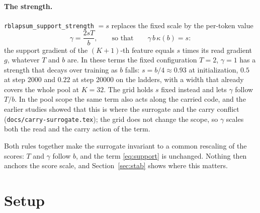 \documentclass[11pt,a4paper]{article}
\newcommand{\code}[1]{\texttt{#1}}
\begin{document}
\paragraph{The strength.}
\code{rblapsum\_support\_strength} $= s$ replaces the fixed scale by the
per-token value
\begin{equation}
\gamma = \frac{2 s T}{b},
\qquad\text{so that}\qquad
\gamma\,b\,\kappa(b) = s :
\label{eq:strength}
\end{equation}
the support gradient of the $(K{+}1)$-th feature equals $s$ times its read
gradient $g$, whatever $T$ and $b$ are. In these terms the fixed configuration
$T = 2$, $\gamma = 1$ has a strength that decays over training as $b$ falls:
$s = b/4 \approx 0.93$ at initialization, $0.5$ at step 2000 and $0.22$ at
step 20000 on the ladders, with a width that already covers the whole pool at
$K = 32$. The grid holds $s$ fixed instead and lets $\gamma$ follow $T/b$. In
the pool scope the same term also acts along the carried code, and the
earlier studies showed that this is where the surrogate and the carry
conflict (\code{docs/carry-surrogate.tex}); the grid does not change the
scope, so $\gamma$ scales both the read and the carry action of the term.

Both rules together make the surrogate invariant to a common rescaling of
the scores: $T$ and $\gamma$ follow $b$, and the term \eqref{eq:support} is
unchanged. Nothing then anchors the score scale, and Section~\ref{sec:stab}
shows where this matters.

\section{Setup}
\end{document}
